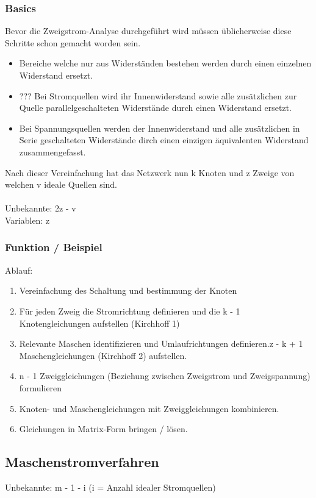 \documentclass{article}
\begin{document}
\subsubsection{Basics}
Bevor die Zweigstrom-Analyse durchgeführt wird müssen üblicherweise diese Schritte schon gemacht worden sein.
\begin{itemize}
    \item Bereiche welche nur aus Widerständen bestehen werden durch einen einzelnen Widerstand ersetzt.
    \item ??? Bei Stromquellen wird ihr Innenwiderstand sowie alle zusätzlichen zur Quelle parallelgeschalteten Widerstände durch einen Widerstand ersetzt.
    \item Bei Spannungsquellen werden der Innenwiderstand und alle zusätzlichen in Serie geschalteten Widerstände dirch einen einzigen äquivalenten Widerstand zusammengefasst.
\end{itemize}
Nach dieser Vereinfachung hat das Netzwerk nun k Knoten und z Zweige von welchen v ideale Quellen sind.\\ \\
Unbekannte: 2z - v \\
Variablen: z
\subsubsection{Funktion / Beispiel}
Ablauf: \\
\begin{enumerate}
    \item Vereinfachung des Schaltung und bestimmung der Knoten
    \item Für jeden Zweig die Stromrichtung definieren und die k - 1 Knotengleichungen aufstellen (Kirchhoff 1)
    \item Relevante Maschen identifizieren und Umlaufrichtungen definieren.z - k + 1 Maschengleichungen (Kirchhoff 2) aufstellen.
    \item n - 1 Zweiggleichungen (Beziehung zwischen Zweigstrom und Zweigspannung) formulieren
    \item Knoten- und Maschengleichungen mit Zweiggleichungen kombinieren.
    \item Gleichungen in Matrix-Form bringen / lösen.
\end{enumerate}
\subsection{Maschenstromverfahren}
Unbekannte: m - 1 - i (i = Anzahl idealer Stromquellen) \\
\end{document}
